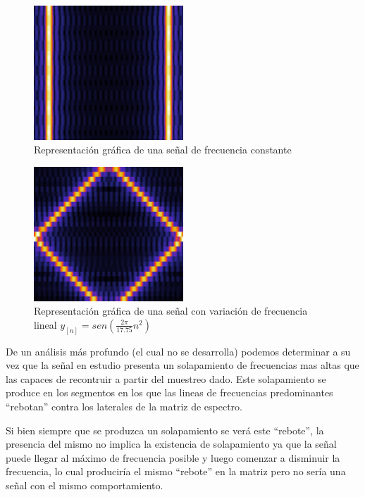 \documentclass{article}
\begin{document}
	
	        \begin{figure}[h!]
	            \centering
	            \includegraphics[width=0.5\textwidth]{./Imagenes/Espectrogramas/constante.jpg}
	            \caption{Representación gráfica de una señal de frecuencia constante}
	            \label{constante}
	        \end{figure}
	
	        \begin{figure}[h!]
	            \centering
	            \includegraphics[width=0.5\textwidth]{./Imagenes/Espectrogramas/variable.jpg}
	            \caption{Representación gráfica de una señal con variación de frecuencia lineal $y_{[n]} = sen(\frac{2\pi}{17.75}n^2)$}
	            \label{variable}
	        \end{figure}
	De un análisis más profundo (el cual no se desarrolla) podemos determinar a su vez que la señal en estudio presenta un solapamiento de frecuencias mas altas que las capaces de recontruir a partir del muestreo dado.
	Este solapamiento se produce en los segmentos en los que las lineas de frecuencias predominantes “rebotan” contra los laterales de la matriz de espectro.
	
	Si bien siempre que se produzca un solapamiento se verá este “rebote”, la presencia del mismo no implica la existencia de solapamiento
	 ya que la señal puede llegar al máximo de frecuencia posible y luego comenzar a disminuir la frecuencia, lo cual produciría el mismo “rebote”
	  en la matriz pero no sería una señal con el mismo comportamiento.
\end{document}
